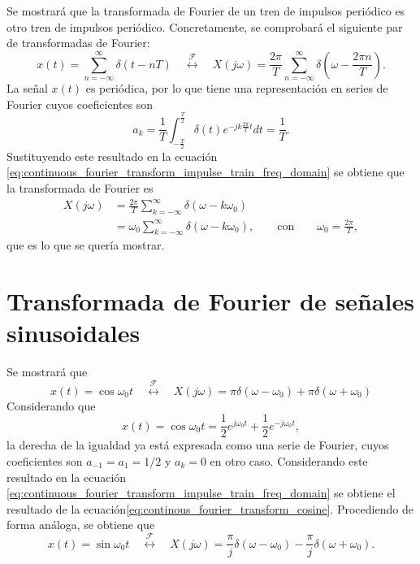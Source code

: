 \documentclass[a4paper]{report}
\begin{document}
Se mostrará que la transformada de Fourier de un tren de impulsos periódico es otro tren de impulsos periódico. Concretamente, se comprobará el siguiente par de transformadas de Fourier:
\begin{equation}\label{eq:continous_fourier_transform_impulse_train}
  x(t)=\sum_{n=-\infty}^{\infty}\delta(t-nT)
  \quad\overset{\mathcal{F}}{\longleftrightarrow}\quad
  X(j\omega)=\frac{2\pi}{T}\sum_{n=-\infty}^{\infty}\delta\left(\omega-\frac{2\pi n}{T}\right).
\end{equation}
La señal \(x(t)\) es periódica, por lo que tiene una representación en series de  Fourier cuyos coeficientes son
\[
a_k=\frac{1}{T}\int_{-\frac{T}{2}}^{\frac{T}{2}}\delta(t)e^{-jk\frac{2\pi}{T}t}dt=\frac{1}{T}.
\]
Sustituyendo este resultado en la ecuación \ref{eq:continuous_fourier_transform_impulse_train_freq_domain} se obtiene que la transformada de Fourier es
\begin{align*}
 X(j\omega)&=\frac{2\pi}{T}\sum_{k=-\infty}^{\infty}\delta(\omega-k\omega_0)\\
  &=\omega_0\sum_{k=-\infty}^{\infty}\delta(\omega-k\omega_0),
  \qquad\textrm{con}\qquad\omega_0=\frac{2\pi}{T},
\end{align*}
que es lo que se quería mostrar.

\section{Transformada de Fourier de señales sinusoidales}

Se mostrará que 
\begin{equation}\label{eq:continous_fourier_transform_cosine}
 x(t)=\cos\omega_0t
 \quad\overset{\mathcal{F}}{\longleftrightarrow}\quad
 X(j\omega)=\pi\delta\left(\omega-\omega_0\right)+\pi\delta\left(\omega+\omega_0\right)
\end{equation}
Considerando que 
\[
 x(t)=\cos\omega_0t=\frac{1}{2}e^{j\omega_0t}+\frac{1}{2}e^{-j\omega_0t},
\]
la derecha de la igualdad ya está expresada como una serie de Fourier, cuyos coeficientes son \(a_{-1}=a_1=1/2\) y \(a_k=0\) en otro caso. Considerando este resultado en la ecuación \ref{eq:continuous_fourier_transform_impulse_train_freq_domain} se obtiene el resultado de la ecuación\ref{eq:continous_fourier_transform_cosine}. Procediendo de forma análoga, se obtiene que
\begin{equation}\label{eq:continous_fourier_transform_sine}
 x(t)=\sin\omega_0t
 \quad\overset{\mathcal{F}}{\longleftrightarrow}\quad
 X(j\omega)=\frac{\pi}{j}\delta\left(\omega-\omega_0\right)-\frac{\pi}{j}\delta\left(\omega+\omega_0\right).
\end{equation}
\end{document}
